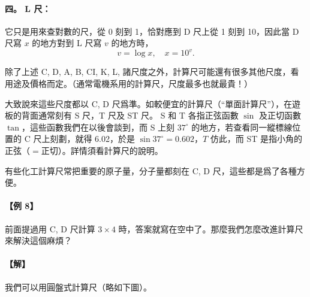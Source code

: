 \paragraph{四。 L 尺：} 它只是用來查對數的尺，從 0 刻到 1，恰對應到 D 尺上從 1 刻到 10，因此當 D 尺寫 $x$ 的地方對到 L 尺寫 $v$ 的地方時，
\[
v = \log x, \quad x = 10^v.
\]

除了上述 C, D, A, B, CI, K, L, 諸尺度之外，計算尺可能還有很多其他尺度，看用途及價格而定。（通常電機系用的計算尺，尺度最多也就最貴！）

大致說來這些尺度都以 C, D 尺爲準。如較便宜的計算尺（“單面計算尺”），在遊板的背面通常刻有 S 尺，T 尺及 ST 尺。 S 和 T 各指正弦函數 $\sin$ 及正切函數 $\tan$，這些函數我們在以後會談到，而 S 上刻 $37^\circ$ 的地方，若查看同一縱標線位置的 C 尺上刻劃，就得 6.02，於是 $\sin 37^\circ = 0.602$，$T$ 仿此，而 ST 是指小角的正弦（$=$正切）。詳情須看計算尺的說明。

有些化工計算尺常把重要的原子量，分子量都刻在 C, D 尺，這些都是爲了各種方便。

\paragraph{【例 8】} 前面提過用 C, D 尺計算 $3 \times 4$ 時，答案就寫在空中了。那麼我們怎麼改進計算尺來解決這個麻煩？

\paragraph{【解】}
我們可以用圓盤式計算尺（略如下圖）。\label{note:b2-ch5-p125-circular-rule-split}

\begin{center}
\end{center}

